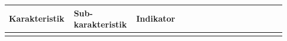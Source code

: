 \begin{longtable}{|p{0.2\linewidth}|p{0.2\linewidth}|p{0.53\linewidth}|}
      \hline
      \multicolumn{1}{|m{0.2\linewidth}|}{\textbf{Karakteristik}} & \multicolumn{1}{m{0.2\linewidth}|}{\textbf{Sub-karakteristik}}                                                                                          & \multicolumn{1}{m{0.53\linewidth}|}{\textbf{Indikator}}                                                                                                                                                                                                                                                                                                                                                                                                                                                                                                                                                                                                                                                                                                                                                                                                                                                                                                                                                                                                                                                                                                                                                                                                                                                                                                                                                                               \\    \hline
      \endhead

      \hline
      \endfoot

      \hline
      \endlastfoot


\end{longtable}
